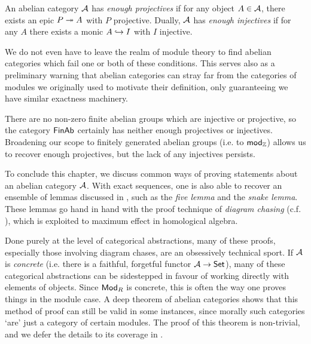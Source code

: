 \begin{definition}
  An abelian category $\mathcal{A}$ has \emph{enough projectives} if
  for any object $A \in \mathcal{A}$, there exists an epic $P \twoheadrightarrow A$
  with $P$ projective.
  Dually, $\mathcal{A}$ has \emph{enough injectives} if for any $A$
  there exists a monic $A \hookrightarrow I$ with $I$ injective.
\end{definition}

We do not even have to leave the realm of module theory to find
abelian categories which fail one or both of these conditions.
This serves also as a preliminary warning that abelian categories can
stray far from the categories of modules we originally used to
motivate their definition, only guaranteeing we have similar
exactness machinery.

\begin{example}
  \label{ex_finab}
  There are no non-zero finite abelian groups which are injective or
  projective, so the category $\mathsf{FinAb}$ certainly has neither enough
  projectives or injectives.
  Broadening our scope to finitely generated abelian groups (i.e. to
  ${\mathsf{mod}}_{{\mathbb{Z}}}$) allows us to recover enough projectives, but the
  lack of any injectives persists.
\end{example}

To conclude this chapter, we discuss common ways of proving
statements about an abelian category $\mathcal{A}$.
With exact sequences, one is also able to recover an ensemble of
lemmas discussed in
\cite[Section~VIII.4]{category_theory_for_the_working_mathematician},
such as the \emph{five lemma} and the \emph{snake lemma}.
These lemmas go hand in hand with the proof technique of
\emph{diagram chasing} (c.f.
\cite[Section~1.6]{category_theory_in_context}), which is exploited
to maximum effect in homological algebra.

Done purely at the level of categorical abstractions, many of these
proofs, especially those involving diagram chases, are an obsessively
technical sport.
If $\mathcal{A}$ is \emph{concrete} (i.e. there is a faithful,
forgetful functor $\mathcal{A} \to \mathsf{Set}$), many of these categorical
abstractions can be sidestepped in favour of working directly with
elements of objects.
Since ${\mathsf{Mod}}_{{R}}$ is concrete, this is often the way one proves things
in the module case.
A deep theorem of abelian categories shows that this method of proof
can still be valid in some instances, since morally such categories
`are' just a category of certain modules.
The proof of this theorem is non-trivial, and we defer the details to
its coverage in \cite[Section~1.6]{weibel}.

